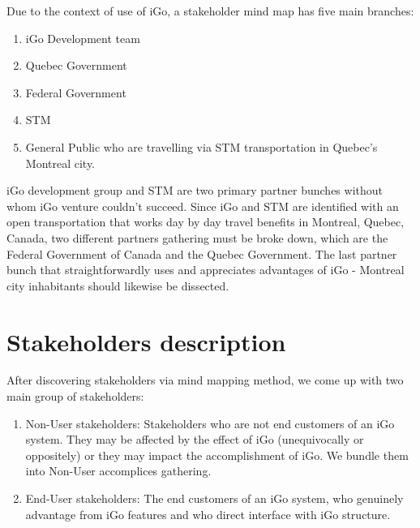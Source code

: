 \documentclass[11pt, english]{report}
\begin{document}
  Due to the context of use of iGo, a stakeholder mind map has five main branches:
  \begin{enumerate}
      \item iGo Development team 
    \item Quebec Government
    \item Federal Government
    \item STM 
    \item General Public who are travelling via STM transportation in Quebec’s Montreal city. 

\end{enumerate}

iGo development group and STM are two primary partner bunches without whom iGo venture couldn't succeed. Since iGo and STM are identified with an open transportation that works day by day travel benefits in Montreal, Quebec, Canada, two different partners gathering must be broke down, which are the Federal Government of Canada and the Quebec Government. The last partner bunch that straightforwardly uses and appreciates advantages of iGo - Montreal city inhabitants should likewise be dissected.

\section{Stakeholders description}
After discovering stakeholders via mind mapping method, we come up with two main group of stakeholders:
\begin{enumerate}
    \item Non-User stakeholders: Stakeholders who are not end customers of an iGo system. They may be affected by the effect of iGo (unequivocally or oppositely) or they may impact the accomplishment of iGo. We bundle them into Non-User accomplices gathering.
    \item End-User stakeholders:
 The end customers of an iGo system, who genuinely advantage from iGo features and who direct interface with iGo structure.

\end{enumerate}
\end{document}
